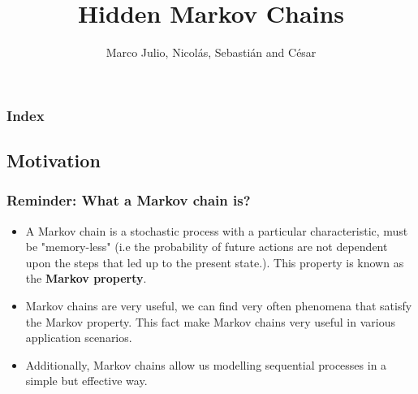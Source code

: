 \documentclass[xcolor=dvipsnames, compress]{beamer}
\title[Hidden Markov Chains]{Hidden Markov Chains}
\author{Marco Julio, Nicolás, Sebastián and César}
\institute[ITAM]
\begin{document}
%
\begin{frame}
\titlepage
\end{frame}

\begin{frame}
\frametitle{Index}
 \tableofcontents%
\end{frame}


%
%

\begin{frame}
\section{Motivation }
\frametitle{Reminder: What a Markov chain is?}

\begin{itemize}	
	\item A Markov chain is a stochastic process with a particular characteristic, must be "memory-less" (i.e the probability of future actions are not dependent upon the steps that led up to the present state.). This property is known as the \textbf{Markov property}.
	
	\item Markov chains are very useful, we can find very often phenomena that satisfy the Markov property. This fact make Markov chains very useful in various application scenarios.

	\item Additionally, Markov chains allow us modelling sequential processes in a simple but effective way.
	
\end{itemize}
\end{frame}
\end{document}
